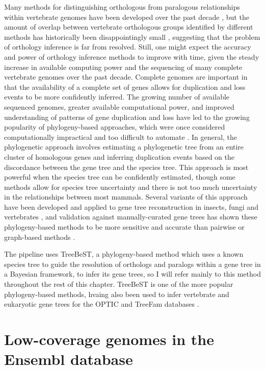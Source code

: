 Many methods for distinguishing orthologous from paralogous
relationships within vertebrate genomes have been developed over the
past decade \citep{Yuan1998,Remm2001}, but the amount of overlap
between vertebrate orthologous groups identified by different methods
has historically been disappointingly small \citep{Chen2007,Jun2009},
suggesting that the problem of orthology inference is far from
resolved. Still, one might expect the accuracy and power of orthology
inference methods to improve with time, given the steady increase in
available computing power and the sequencing of many complete
vertebrate genomes over the past decade. Complete genomes are
important in that the availability of a complete set of genes allows
for duplication and loss events to be more confidently inferred. The
growing number of available sequenced genomes, greater available
computational power, and improved understanding of patterns of gene
duplication and loss have led to the growing popularity of
phylogeny-based approaches, which were once considered computationally
impractical and too difficult to automate \citep{Remm2001}. In
general, the phylogenetic approach involves estimating a phylogenetic
tree from an entire cluster of homologous genes and inferring
duplication events based on the discordance between the gene tree and
the species tree. This approach is most powerful when the species tree
can be confidently estimated, though some methods allow for species
tree uncertainty \citep{Vilella2009} and there is not too much
uncertainty in the relationships between most mammals. Several
variants of this approach have been developed and applied to gene tree
reconstruction in insects, fungi and vertebrates
\citep{Muller2010a,Cepas2007,Datta2009,Vilella2009,Ruan2008,Hahn2007a},
and validation against manually-curated gene trees has shown these
phylogeny-based methods to be more sensitive and accurate than
pairwise or graph-based methods \citep{Datta2009}.

The \cmp pipeline uses TreeBeST, a phylogeny-based method which uses a
known species tree to guide the resolution of orthologs and paralogs
within a gene tree in a Bayesian framework, to infer its gene trees,
so I will refer mainly to this method throughout the rest of this
chapter. TreeBeST is one of the more popular phylogeny-based methods,
hvaing also been used to infer vertebrate and eukaryotic gene trees
for the OPTIC and TreeFam databases
\citep{Heger2008,Ruan2008,Vilella2009}.

\section{Low-coverage genomes in the Ensembl database}
\label{sec_ens_lcv}

